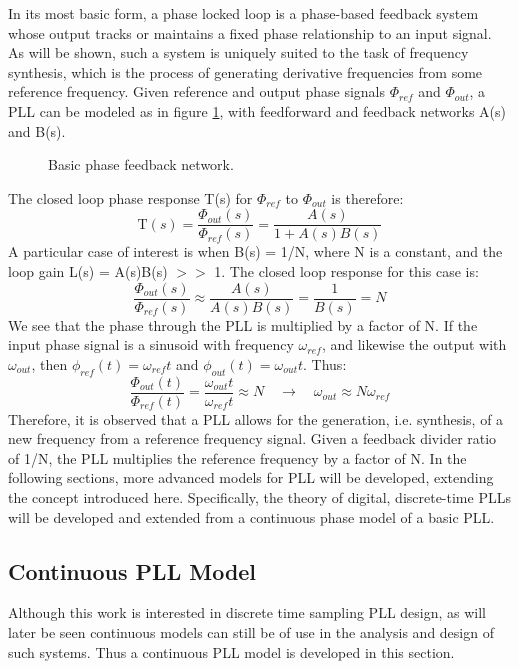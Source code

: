 
	In its most basic form, a phase locked loop is a phase-based feedback system whose output tracks or maintains a fixed phase relationship to an input signal. As will be shown, such a system is uniquely suited to the task of frequency synthesis, which is the process of generating derivative frequencies from some reference frequency. Given reference and output phase signals $\Phi_{ref}$ and $\Phi_{out}$, a PLL can be modeled as in figure \ref{fig:basic_fb}, with feedforward and feedback networks A(s) and B(s). 
	\begin{figure}[htb!]
		\center
		\caption{Basic phase feedback network.}
		\label{fig:basic_fb}
	\end{figure}
	\FloatBarrier
	The closed loop phase response T(s) for $\Phi_{ref}$ to $\Phi_{out}$ is therefore:
	\begin{equation}
		\mathrm{T}(s) = \frac{\Phi_{out}(s)}{\Phi_{ref}(s)} = \frac{A(s)}{1+A(s)B(s)}
	\end{equation}
	A particular case of interest is when B(s) = 1/N, where N is a constant, and the loop gain L(s) = A(s)B(s) $>>$ 1. The closed loop response for this case is:
	\begin{equation}\label{mult_by_n}
		\frac{\Phi_{out}(s)}{\Phi_{ref}(s)} \approx \frac{A(s)}{A(s)B(s)} = \frac{1}{B(s)} = N
	\end{equation}
	We see that the phase through the PLL is multiplied by a factor of N. If the input phase signal is a sinusoid with frequency $\omega_{ref}$, and likewise the output with $\omega_{out}$, then $\phi_{ref}(t)=\omega_{ref}t$ and $\phi_{out}(t)=\omega_{out}t$. Thus:
	\begin{equation}
		\frac{\Phi_{out}(t)}{\Phi_{ref}(t)} = \frac{\omega_{out}t}{\omega_{ref}t} \approx N \hspace{1em} \rightarrow \hspace{1em} \omega_{out} \approx N\omega_{ref}
	\end{equation}
	Therefore, it is observed that a PLL allows for the generation, i.e. synthesis, of a new frequency from a reference frequency signal. Given a feedback divider ratio of 1/N, the PLL multiplies the reference frequency by a factor of N. In the following sections, more advanced models for PLL will be developed, extending the concept introduced here. Specifically, the theory of digital, discrete-time PLLs will be developed and extended from a continuous phase model of a basic PLL.

	\subsection{Continuous PLL Model}
		Although this work is interested in discrete time sampling PLL design, as will later be seen continuous models can still be of use in the analysis and design of such systems. Thus a continuous PLL model is developed in this section.

